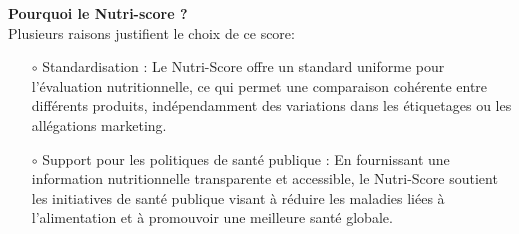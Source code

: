 \documentclass[11pt]{article}
\begin{document}
\textbf{Pourquoi le Nutri-score ?}\\

Plusieurs raisons justifient le choix de ce score:\\

\begin{itemize}

    \item[$\circ$] Standardisation : Le Nutri-Score offre un standard uniforme pour l'évaluation nutritionnelle, ce qui permet une comparaison cohérente entre différents produits, indépendamment des variations dans les étiquetages ou les allégations marketing.\\

    \item[$\circ$] Support pour les politiques de santé publique : En fournissant une information nutritionnelle transparente et accessible, le Nutri-Score soutient les initiatives de santé publique visant à réduire les maladies liées à l'alimentation et à promouvoir une meilleure santé globale.\\
\end{itemize}
\end{document}
